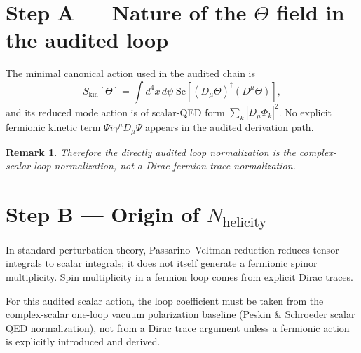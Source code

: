 \documentclass[12pt,a4paper]{article}
\newtheorem{remark}[theorem]{Remark}
\begin{document}
\section{Step A --- Nature of the $\Theta$ field in the audited loop}
The minimal canonical action used in the audited chain is
\begin{equation}
S_{\mathrm{kin}}[\Theta]=\int d^4x\,d\psi\;\mathrm{Sc}\!\left[(D_\mu\Theta)^\dagger(D^\mu\Theta)\right],
\end{equation}
and its reduced mode action is of scalar-QED form
$\sum_k |D_\mu\Phi_k|^2$.
No explicit fermionic kinetic term $\bar\Psi i\gamma^\mu D_\mu\Psi$ appears in the
audited derivation path.

\begin{remark}
Therefore the directly audited loop normalization is the complex-scalar loop
normalization, not a Dirac-fermion trace normalization.
\end{remark}

\section{Step B --- Origin of $N_{\mathrm{helicity}}$}
In standard perturbation theory, Passarino--Veltman reduction reduces tensor
integrals to scalar integrals; it does not itself generate a fermionic spinor
multiplicity. Spin multiplicity in a fermion loop comes from explicit Dirac
traces.

For this audited scalar action, the loop coefficient must be taken from the
complex-scalar one-loop vacuum polarization baseline (Peskin \& Schroeder scalar
QED normalization), not from a Dirac trace argument unless a fermionic action is
explicitly introduced and derived.
\end{document}
